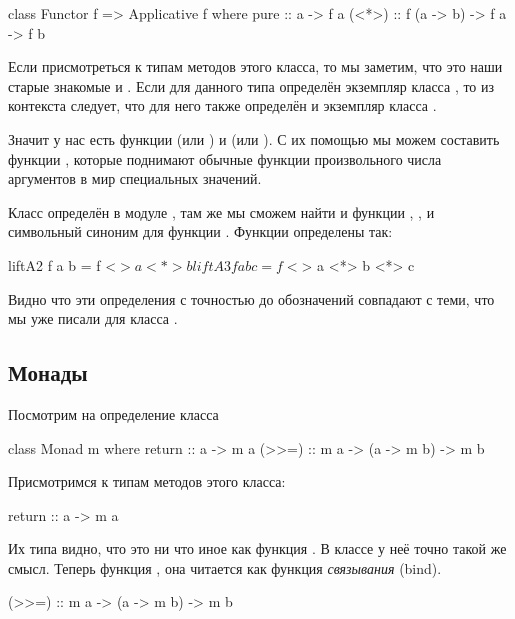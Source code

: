 \begin{code}
class Functor f => Applicative f where
        pure    :: a -> f a
        (<*>)   :: f (a -> b) -> f a -> f b
 \end{code}

Если присмотреться к типам методов этого класса, то
мы заметим, что это наши старые знакомые  и \In{$$}.
Если для данного типа  определён экземпляр класса
, то из контекста следует, что для него
также определён и экземпляр класса . 

Значит у нас есть функции  (или ) 
и \In{<*>} (или \In{$$}). С их помощью мы можем 
составить функции , которые поднимают обычные 
функции произвольного числа аргументов в мир специальных
значений. 

Класс  определён в модуле ,
там же мы сможем найти и функции , , 
и символьный синоним \In{<$>} для функции .
Функции  определены так:

\begin{code}
liftA2 f a b   = f <$> a <*> b
liftA3 f a b c = f <$> a <*> b <*> c
\end{code}

Видно что эти определения с точностью до обозначений 
совпадают с теми, что мы уже писали для класса .

\subsection{Монады}

Посмотрим на определение класса   

\begin{code}
class Monad m where
  return :: a -> m a
  (>>=)  :: m a -> (a -> m b) -> m b
\end{code}

Присмотримся к типам методов этого класса:

\begin{code}
return :: a -> m a
\end{code}

Их типа видно, что это ни что иное как функция . 
В классе  у неё точно такой же смысл. 
Теперь функция \In{>>=}, она читается как функция 
\emph{связывания} (bind). 

\begin{code}
(>>=)  :: m a -> (a -> m b) -> m b
\end{code}

